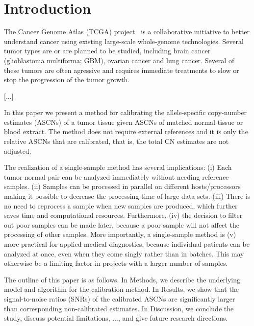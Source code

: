 \documentclass[]{bioinfo}
\begin{document}
\section{Introduction}
\label{secBackground}

The Cancer Genome Atlas (TCGA) project~\citep{CollinsBarker_2007,TCGA_2008c} is a collaborative initiative to better understand cancer using existing large-scale whole-genome technologies.  Several tumor types are or are planned to be studied, including brain cancer (glioblastoma multiforma; GBM), ovarian cancer and lung cancer.  Several of these tumors are often agressive and requires immediate treatments to slow or stop the progression of the tumor growth.

[...]

In this paper we present a method for calibrating the allele-specific copy-number estimates (ASCNs) of a tumor tissue given ASCNs of matched normal tissue or blood extract.  The method does not require external references and it is only the relative ASCNs that are calibrated, that is, the total CN estimates are not adjusted.

The realization of a single-sample method has several implications:
(i) Each tumor-normal pair can be analyzed immediately without needing reference samples.
(ii) Samples can be processed in parallel on different hosts/processors making it possible to decrease the processing time of large data sets.
(iii) There is no need to reprocess a sample when new samples are produced, which further saves time and computational resources.
Furthermore, (iv) the decision to filter out poor samples can be made later, because a poor sample will not affect the processing of other samples.
More importantly, a single-sample method is
(v) more practical for applied medical diagnostics, because individual patients can be analyzed at once, even when they come singly rather than in batches.  This may otherwise be a limiting factor in projects with a larger number of samples.

The outline of this paper is as follows. 
In Methods, we describe the underlying model and algorithm for the calibration method.
In Results, we show that the signal-to-noise ratios (SNRs) of the calibrated ASCNs are significantly larger than corresponding non-calibrated estimates.
In Discussion, we conclude the study, discuss potential limitations, ..., and give future research directions.
\end{document}
